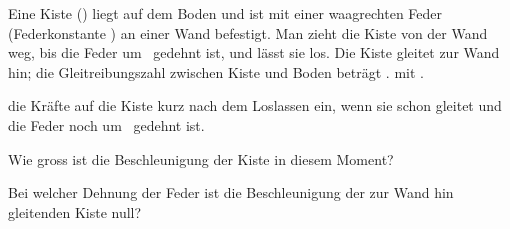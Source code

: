 Eine Kiste (\mKO) liegt auf dem Boden und ist mit einer waagrechten Feder (Federkonstante \kFO) an einer Wand befestigt. Man zieht die Kiste von der Wand weg, bis die Feder um \dxO\ gedehnt ist, und lässt sie los. Die Kiste gleitet zur Wand hin; die Gleitreibungszahl zwischen Kiste und Boden beträgt \muGO.  mit \gO.

\begin{center}
\end{center}

\begin{abcliste}
\abc
{} die Kräfte auf die Kiste kurz nach dem Loslassen ein, wenn sie schon gleitet und die Feder noch um \dxO\ gedehnt ist.

\abc
Wie gross ist die Beschleunigung der Kiste in diesem Moment?

\abc
Bei welcher Dehnung der Feder ist die Beschleunigung der zur Wand hin gleitenden Kiste null?
\end{abcliste}

